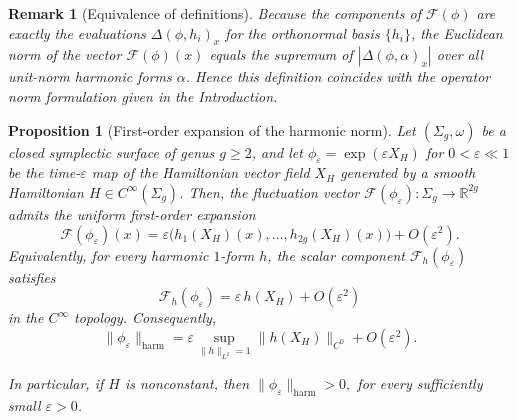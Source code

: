 \documentclass[11pt]{article}
\newtheorem{proposition}[theorem]{Proposition}
\newtheorem{remark}[theorem]{Remark}
\theoremstyle{definition}
\begin{document}
	\begin{remark}[Equivalence of definitions]
		\label{rem:norm_equivalence}
		Because the components of $\mathcal{F}(\phi)$ are exactly the evaluations
		$\Delta(\phi, h_i)_x$ for the orthonormal basis $\{h_i\}$, the Euclidean norm of
		the vector $\mathcal{F}(\phi)(x)$ equals the supremum of $|\Delta(\phi,\alpha)_x|$
		over all unit-norm harmonic forms $\alpha$. Hence this definition coincides with
		the operator norm formulation given in the Introduction.
	\end{remark}
	
	\begin{proposition}[First-order expansion of the harmonic norm]
		\label{prop:first_order_harmonic_norm}
		Let $(\Sigma_g,\omega)$ be a closed symplectic surface of genus $g\ge2$, and let
		$\phi_\varepsilon=\exp(\varepsilon X_H)$ for $0<\varepsilon\ll1$ be the
		time-$\varepsilon$ map of the Hamiltonian vector field $X_H$ generated by a
		smooth Hamiltonian $H\in C^\infty(\Sigma_g)$. Then, the fluctuation vector
		$\mathcal F(\phi_\varepsilon): \Sigma_g \to \mathbb{R}^{2g}$ admits the uniform
		first-order expansion
		\[
		\mathcal F(\phi_\varepsilon)(x)
		=
		\varepsilon \big( h_1(X_H)(x), \dots, h_{2g}(X_H)(x) \big)
		+
		O(\varepsilon^2).
		\]
		Equivalently, for every harmonic $1$-form $h$, the scalar component
		$\mathcal{F}_h(\phi_\varepsilon)$ satisfies
		\[
		\mathcal F_h(\phi_\varepsilon)
		=
		\varepsilon\,h(X_H)
		+
		O(\varepsilon^2)
		\]
		in the $C^\infty$ topology. Consequently,
		\[
		\|\phi_\varepsilon\|_{\mathrm{harm}}
		=
		\varepsilon
		\sup_{\|h\|_{L^2}=1}
		\|h(X_H)\|_{C^0}
		+
		O(\varepsilon^2).
		\]
		
		In particular, if $H$ is nonconstant, then $
		\|\phi_\varepsilon\|_{\mathrm{harm}}>0,$ 
		for every sufficiently small $\varepsilon>0$.
	\end{proposition}
	
\end{document}
